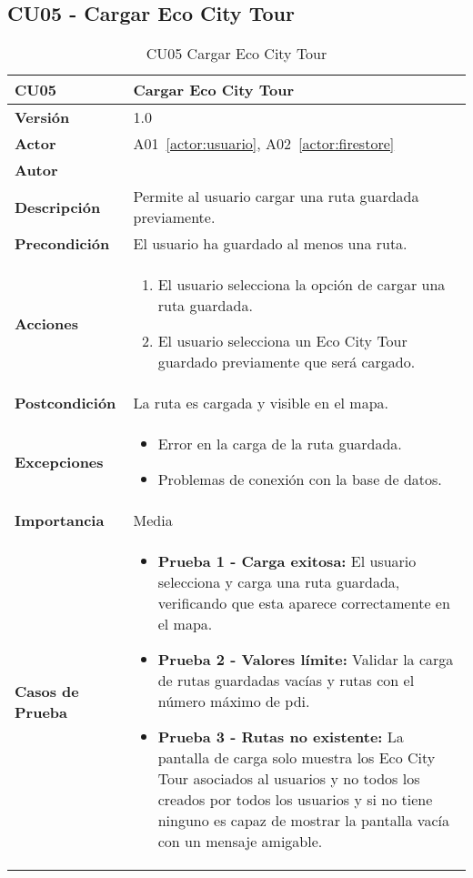 \subsection{CU05 - Cargar Eco City Tour}
\begin{table}[H]
	\centering
	\begin{tabularx}{\linewidth}{ p{} p{} }
		\toprule
		\textbf{CU05}    & \textbf{Cargar Eco City Tour} \\
		\toprule
		\textbf{Versión}              & 1.0    \\
		\textbf{Actor}                & A01~\ref{actor:usuario}, A02~\ref{actor:firestore} \\
		\textbf{Autor}                & \autor \\
		\textbf{Descripción}          & Permite al usuario cargar una ruta guardada previamente. \\
		\textbf{Precondición}         & El usuario ha guardado al menos una ruta. \\
		\textbf{Acciones}             &
		\begin{enumerate}
			\def\labelenumi{\arabic{enumi}.}
			\tightlist
			\item El usuario selecciona la opción de cargar una ruta guardada.
			\item El usuario selecciona un Eco City Tour guardado previamente que será cargado.
		\end{enumerate}\\
		\textbf{Postcondición}        & La ruta es cargada y visible en el mapa. \\
		\textbf{Excepciones}          & 
		\begin{itemize}
			\tightlist
			\item Error en la carga de la ruta guardada.
			\item Problemas de conexión con la base de datos.
		\end{itemize}\\
		\textbf{Importancia}          & Media \\
		\textbf{Casos de Prueba}      &
		\begin{itemize}
			\item \textbf{Prueba 1 - Carga exitosa:} El usuario selecciona y carga una ruta guardada, verificando que esta aparece correctamente en el mapa.
			\vspace{2pt}
			\item \textbf{Prueba 2 - Valores límite:} Validar la carga de rutas guardadas vacías y rutas con el número máximo de \acrshort{pdi}.
			\vspace{2pt}
			\item \textbf{Prueba 3 - Rutas no existente:} La pantalla de carga solo muestra los Eco City Tour asociados al usuarios y no todos los creados por todos los usuarios y si no tiene ninguno es capaz de mostrar la pantalla vacía con un mensaje amigable.
		\end{itemize} \\
		\bottomrule
	\end{tabularx}
	\caption{CU05 Cargar Eco City Tour}
	\label{cu:cargar-tour}
\end{table}


